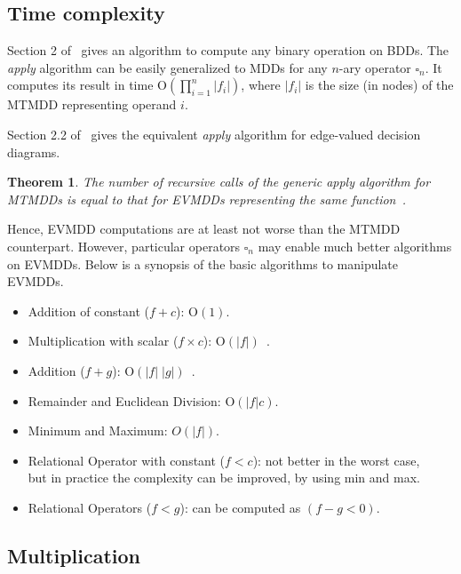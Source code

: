 \documentclass[a4paper]{easychair}
\renewcommand{\O}[1]{\mathrm{O}\left(#1\right)}
\newtheorem{theorem}{Theorem}
\begin{document}
\subsection{Time complexity%
  \label{subsection-time-complexity}}

Section 2 of~\cite{Clarke1995} gives an algorithm to compute any
binary operation on BDDs. The \emph{apply} algorithm can be
easily generalized to MDDs for any
$n$-ary operator $\square_n$. It computes its result in time
$\O{\prod_{i=1}^n |f_i|}$, where $|f_i|$ is the size (in nodes) of the MTMDD representing
operand $i$.

Section 2.2 of~\cite{Lai1996} gives the equivalent \emph{apply} algorithm for
edge-valued decision diagrams.

\begin{theorem}
\label{th:rec-calls}
The number of recursive calls of the generic \emph{apply} algorithm for MTMDDs
is equal to that for EVMDDs representing the same function~\cite{Lai1996}.
\end{theorem}

Hence, EVMDD computations are at least not worse than the MTMDD 
counterpart. However, particular operators $\square_n$ may enable much 
better algorithms on EVMDDs. Below is a synopsis of the basic algorithms to
manipulate EVMDDs.
\begin{itemize}
\addtolength{\itemsep}{-0.5ex}
\item Addition of constant ($f + c$): $\O{1}$.
\item Multiplication with scalar ($f \times c$): $\O{|f|}$~\cite{Lai1996}.
\item Addition ($f + g$): $\O{|f|\;|g|}$~\cite{Lai1996}.
\item Remainder and Euclidean Division: $\O{|f|c}$.
\item Minimum and Maximum: $O(|f|)$.
\item Relational Operator with constant ($f < c$): not better in the worst case,\\
but in practice the complexity can be improved, by using min and max.
\item Relational Operators ($f < g$): can be computed as $(f-g < 0)$.
\end{itemize}

\subsection{Multiplication}
\end{document}
